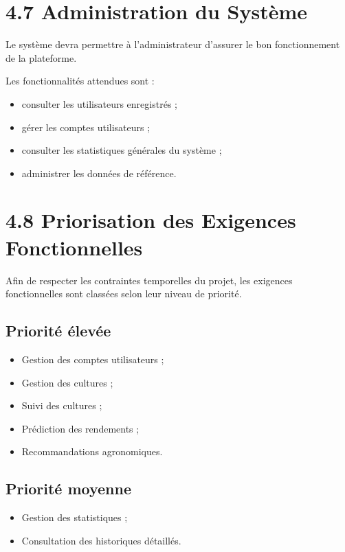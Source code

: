 \documentclass[12pt,a4paper]{report}
\begin{document}
\section{4.7 Administration du
Système}\label{administration-du-systuxe8me}

Le système devra permettre à l'administrateur d'assurer le bon
fonctionnement de la plateforme.

Les fonctionnalités attendues sont :

\begin{itemize}
\item
  consulter les utilisateurs enregistrés ;
\item
  gérer les comptes utilisateurs ;
\item
  consulter les statistiques générales du système ;
\item
  administrer les données de référence.
\end{itemize}

\section{4.8 Priorisation des Exigences
Fonctionnelles}\label{priorisation-des-exigences-fonctionnelles}

Afin de respecter les contraintes temporelles du projet, les exigences
fonctionnelles sont classées selon leur niveau de priorité.

\subsection{Priorité élevée}\label{priorituxe9-uxe9levuxe9e}

\begin{itemize}
\item
  Gestion des comptes utilisateurs ;
\item
  Gestion des cultures ;
\item
  Suivi des cultures ;
\item
  Prédiction des rendements ;
\item
  Recommandations agronomiques.
\end{itemize}

\subsection{Priorité moyenne}\label{priorituxe9-moyenne}

\begin{itemize}
\item
  Gestion des statistiques ;
\item
  Consultation des historiques détaillés.
\end{itemize}
\end{document}
